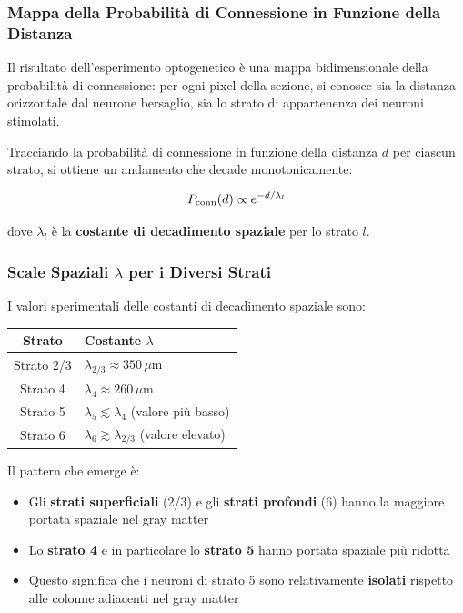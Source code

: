\subsubsection{Mappa della Probabilità di Connessione in Funzione della Distanza}

Il risultato dell'esperimento optogenetico è una mappa bidimensionale della probabilità di connessione: per ogni pixel della sezione, si conosce sia la distanza orizzontale dal neurone bersaglio, sia lo strato di appartenenza dei neuroni stimolati.

Tracciando la probabilità di connessione in funzione della distanza $d$ per ciascun strato, si ottiene un andamento che decade monotonicamente:

\begin{equation}
P_{\rm conn}(d) \propto e^{-d/\lambda_l}
\end{equation}

dove $\lambda_l$ è la \textbf{costante di decadimento spaziale} per lo strato $l$.

\subsubsection{Scale Spaziali $\lambda$ per i Diversi Strati}

I valori sperimentali delle costanti di decadimento spaziale sono:

\begin{table}[htbp]
    \centering
    \renewcommand{\arraystretch}{1.3}
    \begin{tabularx}{\textwidth}{|c|X|}
    \hline
    \textbf{Strato} & \textbf{Costante $\lambda$} \\
    \hline
    Strato 2/3 & $\lambda_{2/3} \approx 350\,\mu\text{m}$ \\
    \hline
    Strato 4 & $\lambda_4 \approx 260\,\mu\text{m}$ \\
    \hline
    Strato 5 & $\lambda_5 \lesssim \lambda_4$ (valore più basso) \\
    \hline
    Strato 6 & $\lambda_6 \gtrsim \lambda_{2/3}$ (valore elevato) \\
    \hline
    \end{tabularx}
\end{table}

Il pattern che emerge è:

\begin{itemize}
    \item Gli \textbf{strati superficiali} (2/3) e gli \textbf{strati profondi} (6) hanno la maggiore portata spaziale nel gray matter
    \item Lo \textbf{strato 4} e in particolare lo \textbf{strato 5} hanno portata spaziale più ridotta
    \item Questo significa che i neuroni di strato 5 sono relativamente \textbf{isolati} rispetto alle colonne adiacenti nel gray matter
\end{itemize}

